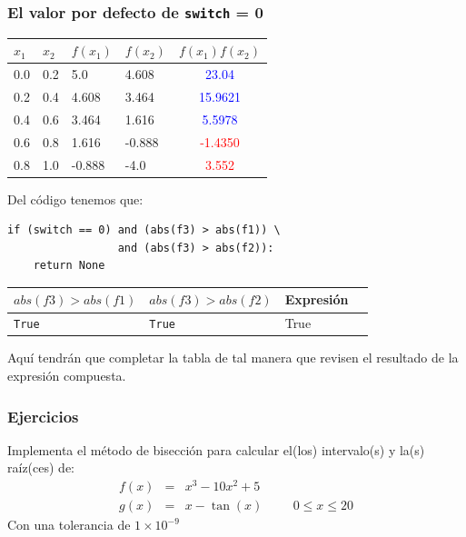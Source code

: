\documentclass[12pt]{beamer}
\begin{document}
\begin{frame}[fragile]
\frametitle{El valor por defecto de \texttt{switch} = 0}
\begin{tabular}{l | l | l | l | c}
$x_{1}$ & $x_{2}$ & $f(x_{1})$ & $f(x_{2})$ & $f(x_{1})f(x_{2})$ \\ \hline
0.0 & 0.2 & 5.0 & 4.608 & \textcolor{blue}{23.04} \\ \hline
0.2 & 0.4 & 4.608 & 3.464 & \textcolor{blue}{15.9621} \\ \hline
0.4 & 0.6 & 3.464 & 1.616 & \textcolor{blue}{5.5978} \\ \hline
0.6 & 0.8 & 1.616 & -0.888 & \textcolor{red}{-1.4350} \\ \hline
0.8 & 1.0 & -0.888 & -4.0 & \textcolor{red}{3.552} \\ \hline
\end{tabular}
\end{frame}
\begin{frame}[fragile]
Del c\'{o}digo tenemos que:
\begin{verbatim}
if (switch == 0) and (abs(f3) > abs(f1)) \ 
                 and (abs(f3) > abs(f2)):
    return None
\end{verbatim}
\begin{tabular}{l  l | l | l}
$abs(f3) > abs(f1)$ & $abs(f3) > abs(f2)$ & Expresi\'{o}n \\ \hline
\texttt{True} & \texttt{True} & True \\ \hline

\end{tabular}
Aqu\'{i} tendr\'{a}n que completar la tabla de tal manera que revisen el resultado de la expresi\'{o}n compuesta.
\end{frame}
\begin{frame}
\frametitle{Ejercicios}
Implementa el m\'{e}todo de bisecci\'{o}n para calcular el(los) intervalo(s) y la(s) ra\'{i}z(ces) de:
\begin{eqnarray*}
	f(x) &=& x^{3} - 10x^{2} + 5 \\
	g(x) &=& x- \tan(x) \hspace{1cm} 0 \leq x \leq 20
\end{eqnarray*}
Con una tolerancia de $1\times 10^{-9}$
\end{frame}
\end{document}
